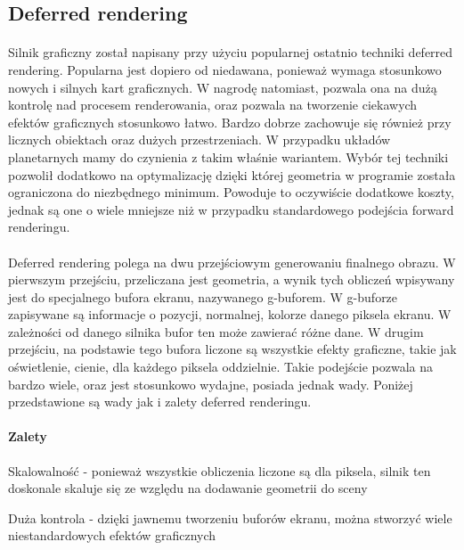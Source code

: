 \subsection{Deferred rendering}\label{sub:deferred rendering}
\paragraph{}

Silnik graficzny został napisany przy użyciu popularnej ostatnio techniki deferred rendering. Popularna jest dopiero od niedawana, ponieważ wymaga stosunkowo nowych i silnych kart graficznych. W nagrodę natomiast, pozwala ona na dużą kontrolę nad procesem renderowania, oraz pozwala na tworzenie ciekawych efektów graficznych stosunkowo łatwo. Bardzo dobrze zachowuje się również przy licznych obiektach oraz dużych przestrzeniach. W przypadku układów planetarnych mamy do czynienia z takim właśnie wariantem. Wybór tej techniki pozwolił dodatkowo na optymalizację dzięki której geometria w programie została ograniczona do niezbędnego minimum. Powoduje to oczywiście dodatkowe koszty, jednak są one o wiele mniejsze niż w przypadku standardowego podejścia forward renderingu.

\paragraph{}

Deferred rendering polega na dwu przejściowym generowaniu finalnego obrazu. W pierwszym przejściu, przeliczana jest geometria, a wynik tych obliczeń wpisywany jest do specjalnego bufora ekranu, nazywanego g-buforem. W g-buforze zapisywane są informacje o pozycji, normalnej, kolorze danego piksela ekranu. W zależności od danego silnika bufor ten może zawierać różne dane. W drugim przejściu, na podstawie tego bufora liczone są wszystkie efekty graficzne, takie jak oświetlenie, cienie, dla każdego piksela oddzielnie. Takie podejście pozwala na bardzo wiele, oraz jest stosunkowo wydajne, posiada jednak wady. Poniżej przedstawione są wady jak i zalety deferred renderingu.

\paragraph{Zalety}

\begin{description}
\item{Skalowalność} - ponieważ wszystkie obliczenia liczone są dla piksela, silnik ten doskonale skaluje się ze względu na dodawanie geometrii do sceny
\item{Duża kontrola} - dzięki jawnemu tworzeniu buforów ekranu, można stworzyć wiele niestandardowych efektów graficznych
\end{description}

